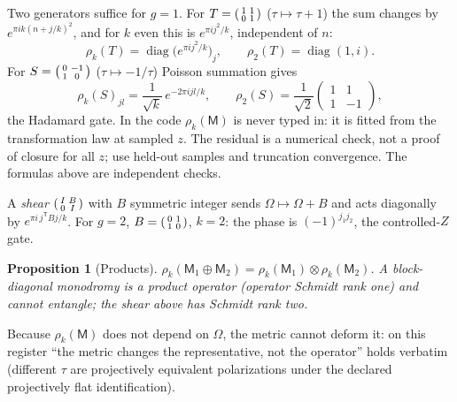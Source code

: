 \documentclass[11pt]{article}
\newtheorem{proposition}[theorem]{Proposition}
\theoremstyle{definition}
\theoremstyle{remark}
\begin{document}
Two generators suffice for $g = 1$. For $T = \begin{psmallmatrix}1&1\\0&1\end{psmallmatrix}$
($\tau\mapsto\tau+1$) the sum changes by $e^{\pi i k(n+j/k)^2}$, and for $k$
even this is $e^{\pi i j^2/k}$, independent of $n$:
\[
  \rho_k(T) = \operatorname{diag}\big(e^{\pi i j^2/k}\big)_{j}, \qquad
  \rho_2(T) = \operatorname{diag}(1, i).
\]
For $S = \begin{psmallmatrix}0&-1\\1&0\end{psmallmatrix}$ ($\tau\mapsto -1/\tau$)
Poisson summation gives
\[
  \rho_k(S)_{jl} = \frac{1}{\sqrt{k}}\, e^{-2\pi i jl/k}, \qquad
  \rho_2(S) = \frac{1}{\sqrt2}\begin{pmatrix}1&1\\1&-1\end{pmatrix},
\]
the Hadamard gate. In the code $\rho_k(\mathsf M)$ is never typed in: it is fitted
from the transformation law at sampled $z$. The residual is a numerical
check, not a proof of closure for all $z$; use held-out samples and truncation
convergence. The formulas above are independent checks.

A \emph{shear} $\begin{psmallmatrix}I&B\\0&I\end{psmallmatrix}$ with $B$
symmetric integer sends $\Omega\mapsto\Omega+B$ and acts diagonally by
$e^{\pi i\, j^{\mathsf T}Bj/k}$. For $g = 2$, $B = \begin{psmallmatrix}0&1\\1&0\end{psmallmatrix}$,
$k = 2$: the phase is $(-1)^{j_1 j_2}$, the controlled-$Z$ gate.

\begin{proposition}[Products]\label{prop:kron}
$\rho_k(\mathsf M_1\oplus \mathsf M_2) = \rho_k(\mathsf M_1)\otimes\rho_k(\mathsf M_2)$. A block-diagonal
monodromy is a product operator (operator Schmidt rank one) and cannot
entangle; the shear above has Schmidt rank two.
\end{proposition}

Because $\rho_k(\mathsf M)$ does not depend on $\Omega$, the metric cannot deform
it: on this register ``the metric changes the representative, not the
operator'' holds verbatim (different $\tau$ are projectively equivalent
polarizations under the declared projectively flat identification).
\end{document}
